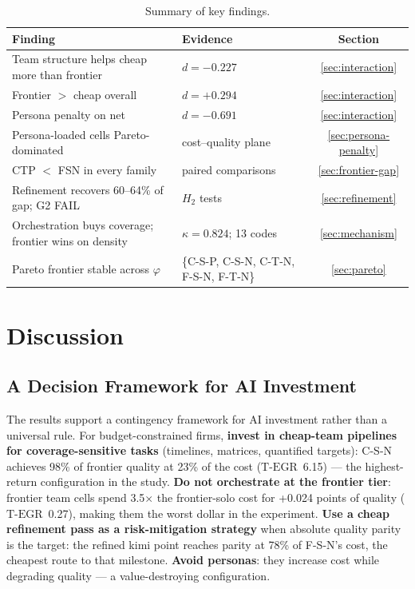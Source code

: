 \documentclass[12pt,a4paper]{article}
\newcommand{\phiBlend}{\varphi}
\newcommand{\TEGR}{\ensuremath{\text{T-EGR}}}
\begin{document}
\begin{table}[ht]
  \centering
  \caption{Summary of key findings.}
  \label{tab:summary-findings}
  \begin{tabularx}{\textwidth}{@{}l l c@{}}
    \toprule
    \textbf{Finding} & \textbf{Evidence} & \textbf{Section} \\
    \midrule
    Team structure helps cheap more than frontier & $d = -0.227$ & \cref{sec:interaction} \\
    Frontier $>$ cheap overall & $d = +0.294$ & \cref{sec:interaction} \\
    Persona penalty on net & $d = -0.691$ & \cref{sec:interaction} \\
    Persona-loaded cells Pareto-dominated & cost--quality plane & \cref{sec:persona-penalty} \\
    CTP $<$ FSN in every family & paired comparisons & \cref{sec:frontier-gap} \\
    Refinement recovers 60--64\% of gap; G2 FAIL & $H_2$ tests & \cref{sec:refinement} \\
    Orchestration buys coverage; frontier wins on density & $\kappa = 0.824$; 13 codes & \cref{sec:mechanism} \\
    Pareto frontier stable across $\phiBlend$ & \{C-S-P, C-S-N, C-T-N, F-S-N, F-T-N\} & \cref{sec:pareto} \\
    \bottomrule
  \end{tabularx}
\end{table}

\section{Discussion}\label{sec:discussion}

\subsection{A Decision Framework for AI Investment}\label{sec:decision-framework}

The results support a contingency framework for AI investment rather than a
universal rule. For budget-constrained firms, \textbf{invest in cheap-team
pipelines for coverage-sensitive tasks} (timelines, matrices, quantified
targets): C-S-N achieves 98\% of frontier quality at 23\% of the cost
($\TEGR$~6.15) --- the highest-return configuration in the study. \textbf{Do not
orchestrate at the frontier tier}: frontier team cells spend 3.5$\times$ the
frontier-solo cost for +0.024 points of quality ($\TEGR$~0.27), making them the
worst dollar in the experiment. \textbf{Use a cheap refinement pass as a
risk-mitigation strategy} when absolute quality parity is the target: the
refined kimi point reaches parity at 78\% of F-S-N's cost, the cheapest route to
that milestone. \textbf{Avoid personas}: they increase cost while degrading
quality --- a value-destroying configuration.
\end{document}
